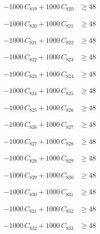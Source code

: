 \documentclass[a4paper,11pt]{article}
\begin{document}
\begin{align}
-1000\,C_{819} + 1000\,C_{820} &\geq 48 \nonumber
\end{align}

\begin{align}
-1000\,C_{820} + 1000\,C_{821} &\geq 48 \nonumber
\end{align}

\begin{align}
-1000\,C_{821} + 1000\,C_{822} &\geq 48 \nonumber
\end{align}

\begin{align}
-1000\,C_{822} + 1000\,C_{823} &\geq 48 \nonumber
\end{align}

\begin{align}
-1000\,C_{823} + 1000\,C_{824} &\geq 48 \nonumber
\end{align}

\begin{align}
-1000\,C_{824} + 1000\,C_{825} &\geq 48 \nonumber
\end{align}

\begin{align}
-1000\,C_{825} + 1000\,C_{826} &\geq 48 \nonumber
\end{align}

\begin{align}
-1000\,C_{826} + 1000\,C_{827} &\geq 48 \nonumber
\end{align}

\begin{align}
-1000\,C_{827} + 1000\,C_{828} &\geq 48 \nonumber
\end{align}

\begin{align}
-1000\,C_{828} + 1000\,C_{829} &\geq 48 \nonumber
\end{align}

\begin{align}
-1000\,C_{829} + 1000\,C_{830} &\geq 48 \nonumber
\end{align}

\begin{align}
-1000\,C_{830} + 1000\,C_{831} &\geq 48 \nonumber
\end{align}

\begin{align}
-1000\,C_{831} + 1000\,C_{832} &\geq 48 \nonumber
\end{align}

\begin{align}
-1000\,C_{832} + 1000\,C_{833} &\geq 48 \nonumber
\end{align}
\end{document}
